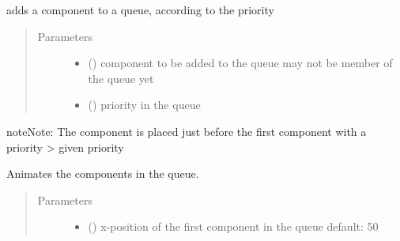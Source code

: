 \documentclass[letterpaper,10pt,english]{sphinxmanual}
\begin{document}
\begin{fulllineitems}
\begin{fulllineitems}
\end{fulllineitems}


\begin{fulllineitems}
\label{\detokenize{Reference:salabim.Queue.add_sorted}}
adds a component to a queue, according to the priority
\begin{quote}\begin{description}
\item[{Parameters}] \leavevmode\begin{itemize}
\item {} 
 ({\hyperref[\detokenize{Reference:salabim.Component}]{}}) \textendash{} component to be added to the queue 
may not be member of the queue yet

\item {} 
 () \textendash{} priority in the queue

\end{itemize}

\end{description}\end{quote}

\begin{sphinxadmonition}{note}{Note:}
The component is placed just before the first component with a priority \textgreater{} given priority
\end{sphinxadmonition}

\end{fulllineitems}


\begin{fulllineitems}
\label{\detokenize{Reference:salabim.Queue.animate}}
Animates the components in the queue.
\begin{quote}\begin{description}
\item[{Parameters}] \leavevmode\begin{itemize}
\item {} 
 () \textendash{} x-position of the first component in the queue 
default: 50


\end{itemize}
\end{description}
\end{quote}
\end{fulllineitems}
\end{fulllineitems}
\end{document}
